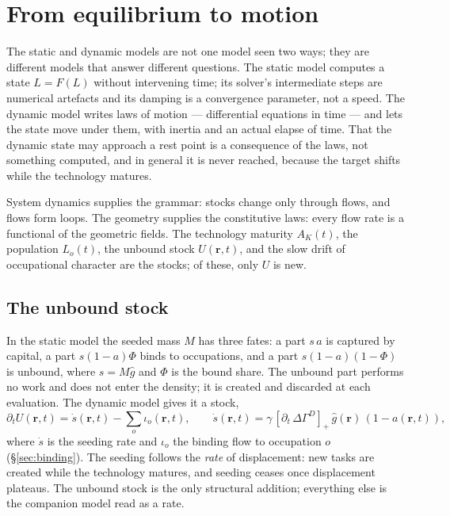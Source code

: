 \documentclass[12pt, a4paper]{article}
\newcommand{\rr}{\mathbf{r}}
\begin{document}
\section{From equilibrium to motion}
\label{sec:motion}

The static and dynamic models are not one model seen two ways; they are
different models that answer different questions. The static model
computes a state $L = F(L)$ without intervening time; its solver's
intermediate steps are numerical artefacts and its damping is a
convergence parameter, not a speed. The dynamic model writes laws of
motion --- differential equations in time --- and lets the state move under
them, with inertia and an actual elapse of time. That the dynamic state
may approach a rest point is a consequence of the laws, not something
computed, and in general it is never reached, because the target shifts
while the technology matures.

System dynamics supplies the grammar: stocks change only through flows,
and flows form loops. The geometry supplies the constitutive laws: every
flow rate is a functional of the geometric fields. The technology
maturity $A_K(t)$, the population $L_o(t)$, the unbound stock
$U(\rr,t)$, and the slow drift of occupational character are the stocks;
of these, only $U$ is new.

\subsection{The unbound stock}

In the static model the seeded mass $M$ has three fates: a part
$s\,a$ is captured by capital, a part $s(1-a)\Phi$ binds to occupations,
and a part $s(1-a)(1-\Phi)$ is unbound, where $s = M\hat g$ and $\Phi$ is
the bound share. The unbound part performs no work and does not enter the
density; it is created and discarded at each evaluation. The dynamic
model gives it a stock,
\begin{equation}
\partial_t U(\rr,t) = \dot s(\rr,t) - \sum_o \iota_o(\rr,t),
\qquad
\dot s(\rr,t) = \gamma\,[\partial_t\,\Delta\Gamma^D]_+\,\hat g(\rr)\,(1-a(\rr,t)),
\label{eq:Ustock}
\end{equation}
where $\dot s$ is the seeding rate and $\iota_o$ the binding flow to
occupation $o$ (\S\ref{sec:binding}). The seeding follows the
\emph{rate} of displacement: new tasks are created while the technology
matures, and seeding ceases once displacement plateaus. The unbound
stock is the only structural addition; everything else is the companion
model read as a rate.
\end{document}
